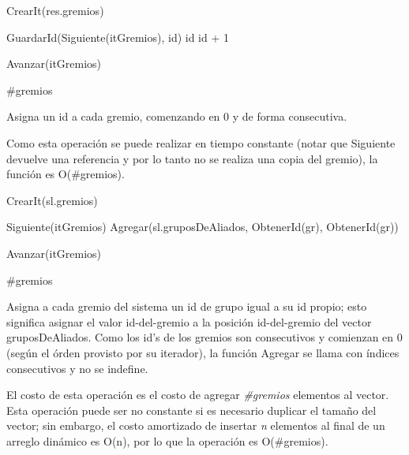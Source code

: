 {
	\state {} 											
	\state

	\state {} \asig CrearIt(res.gremios)		
		\state
		
		\state GuardarId(Siguiente(itGremios), id)							
		\state id \asig id + 1												
		
		\state
		\state Avanzar(itGremios)											
	\endwhile
}
{ \#gremios }
{ Asigna un id a cada gremio, comenzando en 0 y de forma consecutiva.

\hspace{10pt} Como esta operación se puede realizar en tiempo constante (notar que Siguiente devuelve una referencia y por lo tanto no se realiza una copia del gremio), la función es O(\#gremios). }

{
	\state {} \asig CrearIt(sl.gremios)		
											
		\state
		
		\state {} \asig Siguiente(itGremios)							
		\state Agregar(sl.gruposDeAliados, ObtenerId(gr), ObtenerId(gr))	

		\state
		\state Avanzar(itGremios)											
	\endwhile
}
{ \#gremios }
{ Asigna a cada gremio del sistema un id de grupo igual a su id propio; esto significa asignar el valor id-del-gremio a la posición id-del-gremio del vector gruposDeAliados. Como los id's de los gremios son consecutivos y comienzan en 0 (según el órden provisto por su iterador), la función Agregar se llama con índices consecutivos y no se indefine.

\hspace{10pt} El costo de esta operación es el costo de agregar \emph{\#gremios} elementos al vector. Esta operación puede ser no constante si es necesario duplicar el tamaño del vector; sin embargo, el costo amortizado de insertar \emph{n} elementos al final de un arreglo dinámico es O(n), por lo que la operación es O(\#gremios). }


